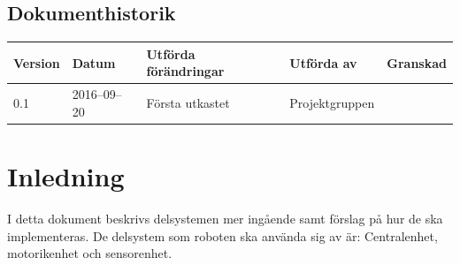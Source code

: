 \documentclass[a4paper,titlepage,12pt]{article}
\begin{document}
\begin{center}
		\newpage
		\tableofcontents
		\newpage



		\section*{Dokumenthistorik}
		\renewcommand*{\arraystretch}{1.4}
		\begin{longtable}[c]{ l l l l l }
			\textbf{Version} & \textbf{Datum} & \textbf{Utförda förändringar} 
			& \textbf{Utförda av} & \textbf{Granskad} \\ \midrule
			
			0.1 & 2016--09--20 & Första utkastet & Projektgruppen & \\
		\end{longtable}
	\end{center}


	\newpage

	\section{Inledning}
	I detta dokument beskrivs delsystemen mer ingående samt förslag på hur de ska 
    implementeras. De delsystem som roboten ska använda sig av är:
	Centralenhet, motorikenhet och sensorenhet.

\end{document}

